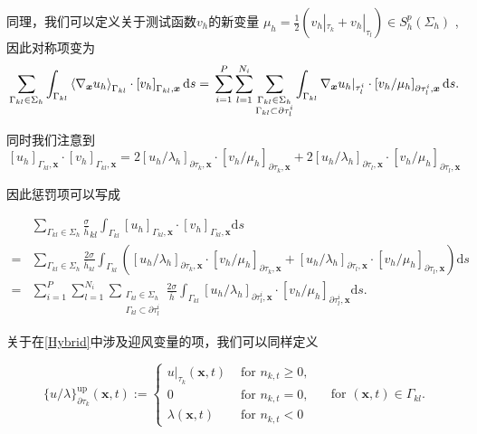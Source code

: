 同理，我们可以定义关于测试函数$v_h$的新变量 $\mu_h=\frac{1}{2}(v_h|_{\tau_k}+v_h|_{\tau_l})\in S_h^p(\Sigma_h)$ , 因此对称项变为
$$\sum_{\Gamma_{k l} \in \Sigma_{h}} \int_{\Gamma_{k l}}\left\langle\nabla_{\boldsymbol{x}} u_{h}\right\rangle_{\Gamma_{k l}} \cdot\left[v_{h}\right]_{\Gamma_{k l}, \boldsymbol{x}} \mathrm{d} s= \\
    \sum_{i=1}^{P} \sum_{l=1}^{N_{i}} \sum_{\substack{\Gamma_{k l} \in \Sigma_{h} \\
    \Gamma_{k l} \subset \partial \tau_{l}^{i}}} \int_{\Gamma_{k l}} \nabla_{\boldsymbol{x}} u_{h }|_{\tau_{l}^{i}}\cdot\left[v_{h} / \mu_{h}\right]_{\partial \tau_{l}^{i}, \boldsymbol{x}} \mathrm{d} s . \\$$

同时我们注意到 
$${\left[u_{h}\right]_{\Gamma_{k l}, \boldsymbol{x}} \cdot\left[v_{h}\right]_{\Gamma_{k l}, \boldsymbol{x}}}    
    =2\left[u_{h} / \lambda_{h}\right]_{\partial \tau_{k}, \boldsymbol{x}} \cdot\left[v_{h} / \mu_{h}\right]_{\partial \tau_{k}, \boldsymbol{x}}
    +2\left[u_{h} / \lambda_{h}\right]_{\partial \tau_{l}, \boldsymbol{x}} \cdot\left[v_{h} / \mu_{h}\right]_{\partial \tau_{l}, \boldsymbol{x}}$$    
    
因此惩罚项可以写成
    
$$\begin{aligned}
&\sum_{\Gamma_{k l} \in \Sigma_{h}} \frac{\sigma}{\bar{h}}_{k l} \int_{\Gamma_{k l}}\left[u_{h}\right]_{\Gamma_{k l}, \boldsymbol{x}} \cdot\left[v_{h}\right]_{\Gamma_{k l}, \boldsymbol{x}} \mathrm{d} s \\
=&\sum_{\Gamma_{k l} \in \Sigma_{h}} \frac{2 \sigma}{\bar{h}_{k l}} \int_{\Gamma_{k l}}\left( {\left[u_{h} / \lambda_{h}\right]_{\partial \tau_{k}, \boldsymbol{x}} \cdot\left[v_{h} / \mu_{h}\right]_{\partial \tau_{k}, \boldsymbol{x}} }+\left[u_{h} / \lambda_{h}\right]_{\partial \tau_{l}, \boldsymbol{x}} \cdot\left[v_{h} / \mu_{h}\right]_{\partial \tau_{l}, \boldsymbol{x}}\right) \mathrm{d} s \\
=&\sum_{i=1}^{P} \sum_{l=1}^{N_{i}} \sum_{\substack{\Gamma_{k l} \in \Sigma_{h} \\
\Gamma_{k l} \subset \partial \tau_{l}^{i}}} \frac{2 \sigma}{\overline{h}} \int_{\Gamma_{k l}}\left[u_{h} / \lambda_{h}\right]_{\partial \tau_{l}^{i}, \boldsymbol{x}} \cdot\left[v_{h} / \mu_{h}\right]_{\partial \tau_{l}^{i}, \boldsymbol{x}} \mathrm{d} s .
\end{aligned}$$

关于在\ref{Hybrid}中涉及迎风变量的项，我们可以同样定义
\begin{definition}
    $$\{u / \lambda\}_{\partial \tau_{k}}^{\operatorname{up}}(\boldsymbol{x}, t):=\left\{\begin{array}{ll}
        u|_{ \tau_{k}}(\boldsymbol{x}, t) & \text { for } n_{k, t} \geq 0, \\
        0 & \text { for } n_{k, t}=0, \\
        \lambda(\boldsymbol{x}, t) & \text { for } n_{k, t}<0
        \end{array} \quad \text { for }(\boldsymbol{x}, t) \in \Gamma_{k l} .\right.$$
\end{definition}

